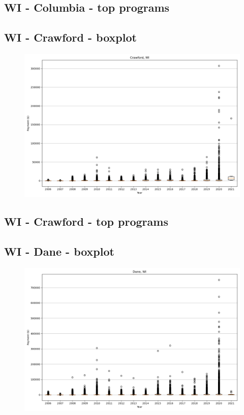 \subsection*{WI - Columbia - top programs}

\newpage
\subsection*{WI - Crawford - boxplot}
\begin{figure}[h]
\centering
\includegraphics[width=7in]{../output/boxplots/counties/Crawford-WI_boxplot.png}
\end{figure}


\subsection*{WI - Crawford - top programs}

\newpage
\subsection*{WI - Dane - boxplot}
\begin{figure}[h]
\centering
\includegraphics[width=7in]{../output/boxplots/counties/Dane-WI_boxplot.png}
\end{figure}


